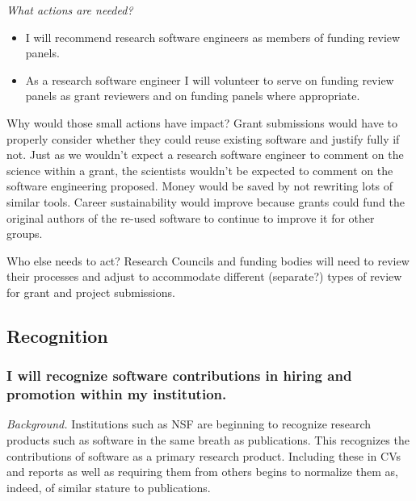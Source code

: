 \documentclass[a4paper,UKenglish]{dagman}
\renewcommand{\paragraph}[1]{\subsubsection*{#1}\xspace}
\newcommand{\etc}{\emph{etc.}\xspace}
\begin{document}
\emph{What actions are needed?}
\begin{itemize}
\item I will recommend research software engineers as members of funding review panels.
\item As a research software engineer I will volunteer to serve on funding review panels as grant reviewers and on funding panels where appropriate.
\end{itemize}

Why would those small actions have impact?
Grant submissions would have to properly consider whether they could reuse existing software and justify fully if not.
Just as we wouldn't expect a research software engineer to comment on the science within a grant, the scientists wouldn't be expected to comment on the software engineering proposed.
Money would be saved by not rewriting lots of similar tools.
Career sustainability would improve because grants could fund the original authors of the re-used software to continue to improve it for other groups.

Who else needs to act?
Research Councils and funding bodies will need to review their processes and adjust to accommodate different (separate?) types of review for grant and project submissions.

\subsection{Recognition}


\paragraph{I will recognize software contributions in hiring and promotion within my institution.}

\emph{Background.}
Institutions such as NSF are beginning to recognize research products such as software in the same breath as publications. This recognizes the contributions of software as a primary research product. Including these in CVs and reports as well as requiring them from others begins to normalize them as, indeed, of similar stature to publications. 
\end{document}
